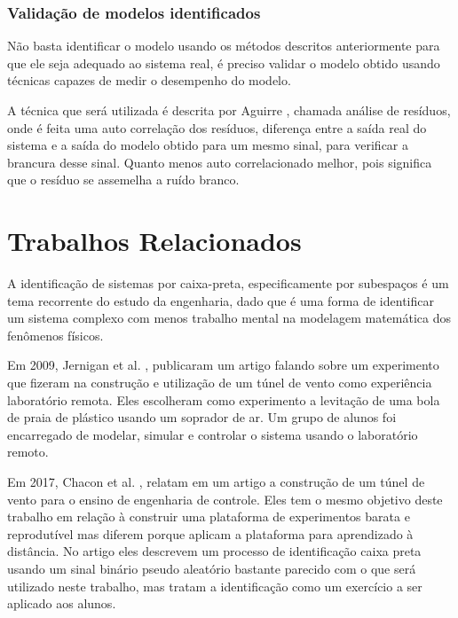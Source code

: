 \subsubsection{Validação de modelos identificados}

Não basta identificar o modelo usando os métodos descritos anteriormente para que ele seja adequado ao sistema real, é preciso validar o modelo obtido usando técnicas capazes de medir o desempenho do modelo.


A técnica que será utilizada é descrita por Aguirre \cite{aguirre2015}, chamada análise de resíduos, onde é feita uma auto correlação dos resíduos, diferença entre a saída real do sistema e a saída do modelo obtido para um mesmo sinal, para verificar a brancura desse sinal. Quanto menos auto correlacionado melhor, pois significa que o resíduo se assemelha a ruído branco.

\section{Trabalhos Relacionados}


A identificação de sistemas por caixa-preta, especificamente por subespaços é um tema recorrente do estudo da engenharia, dado que é uma forma de identificar um sistema complexo com menos trabalho mental na modelagem matemática dos fenômenos físicos.


Em 2009, Jernigan et al. \cite{jernigan2009}, publicaram um artigo falando sobre um experimento que fizeram na construção e utilização de um túnel de vento como experiência laboratório remota. Eles escolheram como experimento a levitação de uma bola de praia de plástico usando um soprador de ar. Um grupo de alunos foi encarregado de modelar, simular e controlar o sistema usando o laboratório remoto.


Em 2017, Chacon et al. \cite{chacon2017}, relatam em um artigo a construção de um túnel de vento para o ensino de engenharia de controle. Eles tem o mesmo objetivo deste trabalho em relação à construir uma plataforma de experimentos barata e reprodutível mas diferem porque aplicam a plataforma para aprendizado à distância. No artigo eles descrevem um processo de identificação caixa preta usando um sinal binário pseudo aleatório bastante parecido com o que será utilizado neste trabalho, mas tratam a identificação como um exercício a ser aplicado aos alunos.


















